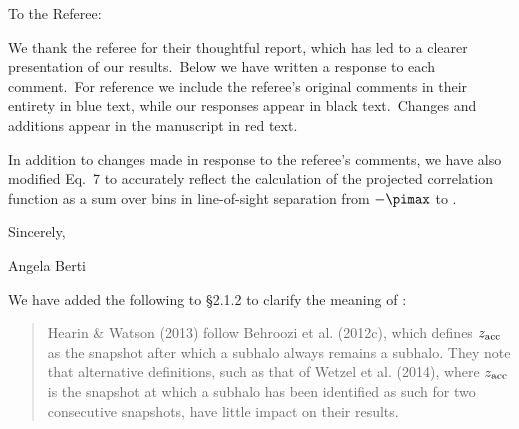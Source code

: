 \documentclass[11pt,preprint]{aastex}
\begin{document}
\thispagestyle{plain}

\begin{flushleft}
To the Referee:

We thank the referee for their thoughtful report, which has led to a clearer presentation of our results.\ Below we have written a response to each comment.\ For reference we include the referee's original comments in their entirety in blue text, while our responses appear in black text.\ Changes and additions appear in the manuscript in {\color{red} red} text.

In addition to changes made in response to the referee's comments, we have also modified Eq.\ 7 to accurately reflect the calculation of the projected correlation function as a sum over bins in line-of-sight separation from $-\pimax$ to \pimax.

\end{flushleft}
\noindent Sincerely,

\noindent Angela Berti
\vspace{1cm}

\noindent {}

We have added the following to \S2.1.2 to clarify the meaning of \zacc:
\begin{quotation}
Hearin \& Watson (2013) follow Behroozi et al. (2012c), which defines $z_{\rm acc}$ as the snapshot after which a subhalo always remains a subhalo. They note that alternative definitions, such as that of Wetzel et al. (2014), where $z_{\rm acc}$ is the snapshot at which a subhalo has been identified as such for two consecutive snapshots, have little impact on their results.
\end{quotation}
\end{document}
